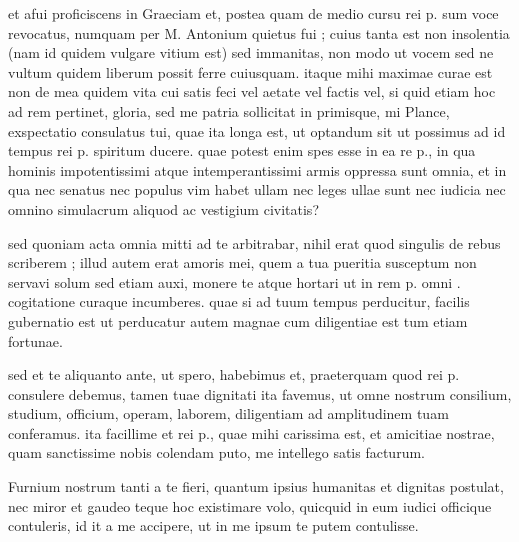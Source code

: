 


 et afui proficiscens in Graeciam et, postea quam de medio cursu rei p. sum voce revocatus, numquam per M. Antonium quietus fui ; cuius tanta est non insolentia (nam id quidem vulgare vitium est) sed immanitas, non modo ut vocem sed ne vultum quidem liberum possit ferre cuiusquam. itaque mihi maximae curae est non de mea quidem vita cui satis feci vel aetate vel factis vel, si quid etiam hoc ad rem pertinet, gloria, sed me patria sollicitat in primisque, mi Plance, exspectatio consulatus tui, quae ita longa est, ut optandum sit ut possimus ad id tempus rei p. spiritum ducere. quae potest enim spes esse in ea re p., in qua hominis impotentissimi atque intemperantissimi armis oppressa sunt omnia, et in qua nec senatus nec populus vim habet ullam nec leges ullae sunt nec iudicia nec omnino simulacrum aliquod ac vestigium civitatis?

 sed quoniam acta omnia mitti ad te arbitrabar, nihil erat quod singulis de rebus scriberem ; illud autem erat amoris mei, quem a tua pueritia susceptum non servavi solum sed etiam auxi, monere te atque hortari ut in rem p. omni . cogitatione curaque incumberes. quae si ad tuum tempus perducitur, facilis gubernatio est ut perducatur autem magnae cum diligentiae est tum etiam fortunae.

 sed et te aliquanto ante, ut spero, habebimus et, praeterquam quod rei p. consulere debemus, tamen tuae dignitati ita favemus, ut omne nostrum consilium, studium, officium, operam, laborem, diligentiam ad amplitudinem tuam conferamus. ita facillime et rei p., quae mihi carissima est, et amicitiae nostrae, quam sanctissime nobis colendam puto, me intellego satis facturum.

 Furnium nostrum tanti a te fieri, quantum ipsius humanitas et dignitas postulat, nec miror et gaudeo teque hoc existimare volo, quicquid in eum iudici officique contuleris, id it a me accipere, ut in me ipsum te putem contulisse.
